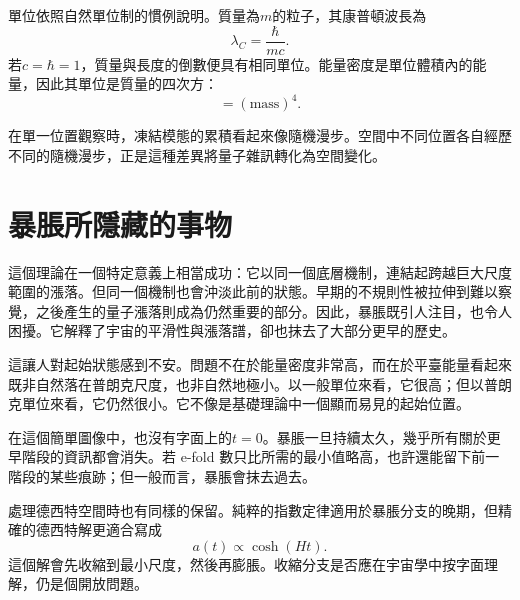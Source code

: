 單位依照自然單位制的慣例說明。質量為\(m\)的粒子，其康普頓波長為
\begin{equation}
\lambda_C=\frac{\hbar}{mc}.
\end{equation}
若\(c=\hbar=1\)，質量與長度的倒數便具有相同單位。能量密度是單位體積內的能量，因此其單位是質量的四次方：
\begin{equation}
[\rho]=(\mathrm{mass})^4.
\end{equation}

在單一位置觀察時，凍結模態的累積看起來像隨機漫步。空間中不同位置各自經歷不同的隨機漫步，正是這種差異將量子雜訊轉化為空間變化。

\begin{classroomqa}
\end{classroomqa}

\section{暴脹所隱藏的事物}

這個理論在一個特定意義上相當成功：它以同一個底層機制，連結起跨越巨大尺度範圍的漲落。但同一個機制也會沖淡此前的狀態。早期的不規則性被拉伸到難以察覺，之後產生的量子漲落則成為仍然重要的部分。因此，暴脹既引人注目，也令人困擾。它解釋了宇宙的平滑性與漲落譜，卻也抹去了大部分更早的歷史。

這讓人對起始狀態感到不安。問題不在於能量密度非常高，而在於平臺能量看起來既非自然落在普朗克尺度，也非自然地極小。以一般單位來看，它很高；但以普朗克單位來看，它仍然很小。它不像是基礎理論中一個顯而易見的起始位置。

在這個簡單圖像中，也沒有字面上的\(t=0\)。暴脹一旦持續太久，幾乎所有關於更早階段的資訊都會消失。若 e-fold 數只比所需的最小值略高，也許還能留下前一階段的某些痕跡；但一般而言，暴脹會抹去過去。

處理德西特空間時也有同樣的保留。純粹的指數定律適用於暴脹分支的晚期，但精確的德西特解更適合寫成
\begin{equation}
a(t)\propto \cosh(Ht).
\end{equation}
這個解會先收縮到最小尺度，然後再膨脹。收縮分支是否應在宇宙學中按字面理解，仍是個開放問題。

\begin{classroomqa}
\end{classroomqa}

